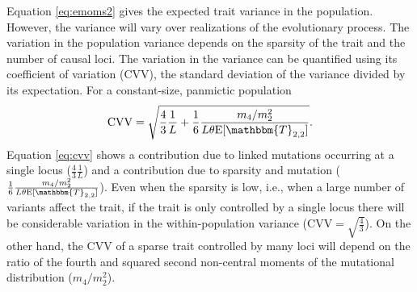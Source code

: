 Equation \eqref{eq:emoms2} gives the expected trait variance in the population.
However, the variance will vary over realizations of the evolutionary process.
The variation in the population variance depends on the sparsity of the trait
and the number of causal loci. The variation in the variance can be quantified
using its coefficient of variation (CVV), the standard deviation of the variance
divided by its expectation. For a constant-size, panmictic population
\begin{equation}
  \label{eq:cvv}
  \mathrm{CVV} = \sqrt{\frac{4}{3}\frac{1}{L} +
    \frac{1}{6}\frac{m_4/m_2^2}{L\theta \E[\mathbbm{T}_{2,2}]}}.
\end{equation}
Equation \eqref{eq:cvv} shows a contribution due to linked mutations occurring
at a single locus ($\frac{4}{3}\frac{1}{L}$) and a contribution due to sparsity
and mutation ($\frac{1}{6}\frac{m_4/m_2^2}{L\theta \E[\mathbbm{T}_{2,2}]}$).
Even when the sparsity is low, i.e., when a large number of variants affect the
trait, if the trait is only controlled by a single locus there will be
considerable variation in the within-population variance
(CVV$=\sqrt{\frac{4}{3}}$). On the other hand, the CVV of a sparse trait
controlled by many loci will depend on the ratio of the fourth and squared
second non-central moments of the mutational distribution ($m_4/m_2^2$).


